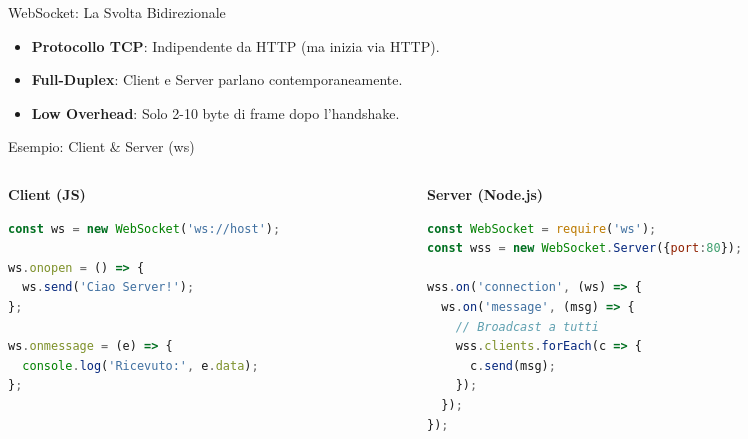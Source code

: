 \documentclass[10pt]{beamer}
\begin{document}
\begin{frame}{WebSocket: La Svolta Bidirezionale}
    \begin{itemize}
        \item \textbf{Protocollo TCP}: Indipendente da HTTP (ma inizia via HTTP).
        \item \textbf{Full-Duplex}: Client e Server parlano contemporaneamente.
        \item \textbf{Low Overhead}: Solo 2-10 byte di frame dopo l'handshake.
    \end{itemize}
    \centering
\end{frame}

\begin{frame}[fragile]{Esempio: Client \& Server (ws)}
    \begin{columns}
        \begin{column}{0.5\textwidth}
            \centering \textbf{Client (JS)}
            \begin{lstlisting}[language=javascript]
const ws = new WebSocket('ws://host');

ws.onopen = () => {
  ws.send('Ciao Server!');
};

ws.onmessage = (e) => {
  console.log('Ricevuto:', e.data);
};
            \end{lstlisting}
        \end{column}
        \begin{column}{0.5\textwidth}
            \centering \textbf{Server (Node.js)}
            \begin{lstlisting}[language=javascript]
const WebSocket = require('ws');
const wss = new WebSocket.Server({port:80});

wss.on('connection', (ws) => {
  ws.on('message', (msg) => {
    // Broadcast a tutti
    wss.clients.forEach(c => {
      c.send(msg);
    });
  });
});
            \end{lstlisting}
        \end{column}
    \end{columns}
\end{frame}
\end{document}
